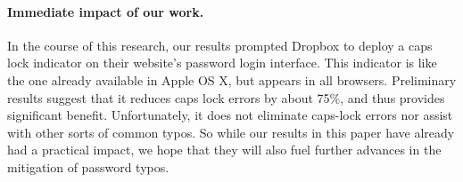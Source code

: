 \paragraph{Immediate impact of our work.}
In the course of this research, our results prompted Dropbox to deploy a caps
lock indicator on their website's password login interface. This indicator is
like the one already available in Apple OS X, but appears in all
browsers. Preliminary results suggest that it reduces caps lock errors by
about 75\%, and thus provides
significant benefit. Unfortunately, it does not eliminate caps-lock errors nor
assist with other sorts of common typos. So while our results in this paper have
already had a practical impact, we hope that they will also fuel further
advances in the mitigation of password typos.




